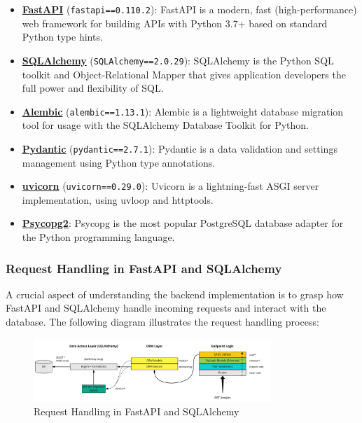 \begin{itemize}
    \item \textbf{\href{https://fastapi.tiangolo.com/}{FastAPI}} (\texttt{fastapi==0.110.2}): FastAPI is a modern, fast (high-performance) web framework for building APIs with Python 3.7+ based on standard Python type hints.

    \item \textbf{\href{https://www.sqlalchemy.org/}{SQLAlchemy}} (\texttt{SQLAlchemy==2.0.29}): SQLAlchemy is the Python SQL toolkit and Object-Relational Mapper that gives application developers the full power and flexibility of SQL.

    \item \textbf{\href{https://alembic.sqlalchemy.org/en/latest/}{Alembic}} (\texttt{alembic==1.13.1}): Alembic is a lightweight database migration tool for usage with the SQLAlchemy Database Toolkit for Python.

    \item \textbf{\href{https://docs.pydantic.dev/latest/}{Pydantic}} (\texttt{pydantic==2.7.1}): Pydantic is a data validation and settings management using Python type annotations.

    \item \textbf{\href{https://www.uvicorn.org/}{uvicorn}} (\texttt{uvicorn==0.29.0}): Uvicorn is a lightning-fast ASGI server implementation, using uvloop and httptools.

    \item \textbf{\href{https://pypi.org/project/psycopg2/}{Psycopg2}}: Psycopg is the most popular PostgreSQL database adapter for the Python programming language.
\end{itemize}

\subsubsection{Request Handling in FastAPI and SQLAlchemy}

A crucial aspect of understanding the backend implementation is to grasp how FastAPI and SQLAlchemy handle incoming requests and interact with the database. The following diagram illustrates the request handling process:

\begin{figure}[h]
    \centering
    \includegraphics[width=0.8\textwidth]{images/request_handling_diagram}
    \caption{Request Handling in FastAPI and SQLAlchemy \citet{samiullah_fastapi_tutorial}}
    \label{fig:request_handling}
\end{figure}


